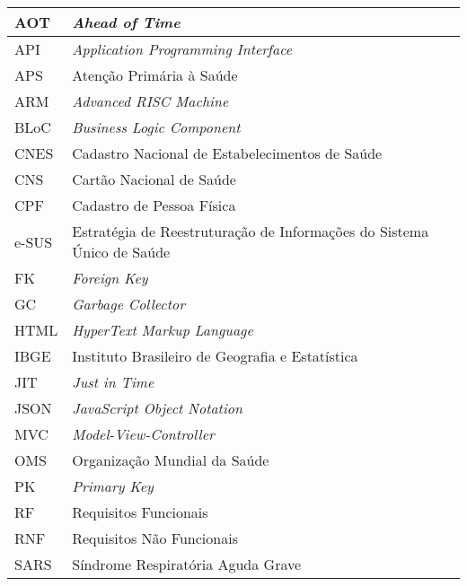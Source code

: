 
\begin{center}
  \setlength{\arrayrulewidth}{0.1mm}
  \captionsetup{}
  \begin{longtable}{ll}
    \hline
    AOT    & \textit{Ahead of Time} \\ \hline
    API    & \textit{Application Programming Interface} \\ \hline
    APS    & Atenção Primária à Saúde \\ \hline
    ARM    & \textit{Advanced RISC Machine} \\ \hline
    BLoC   & \textit{Business Logic Component} \\ \hline
    CNES   & Cadastro Nacional de Estabelecimentos de Saúde \\ \hline
    CNS    & Cartão Nacional de Saúde \\ \hline
    CPF    & Cadastro de Pessoa Física \\ \hline
    e-SUS  & Estratégia de Reestruturação de Informações do Sistema Único de Saúde \\ \hline
    FK     & \textit{Foreign Key} \\ \hline
    GC     & \textit{Garbage Collector} \\ \hline
    HTML   & \textit{HyperText Markup Language} \\ \hline
    IBGE   & Instituto Brasileiro de Geografia e Estatística \\ \hline
    JIT    & \textit{Just in Time} \\ \hline
    JSON   & \textit{JavaScript Object Notation} \\ \hline
    MVC    & \textit{Model-View-Controller} \\ \hline
    OMS    & Organização Mundial da Saúde \\ \hline
    PK     & \textit{Primary Key} \\ \hline
    RF     & Requisitos Funcionais \\ \hline
    RNF    & Requisitos Não Funcionais \\ \hline
    SARS   & Síndrome Respiratória Aguda Grave \\ \hline

\end{longtable}
\end{center}
